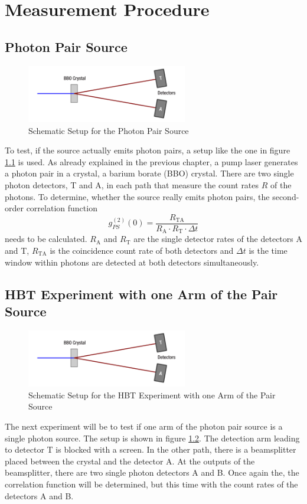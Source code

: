 \chapter{Measurement Procedure}
\section{Photon Pair Source}
\begin{figure}[H]
    \centering
    \includegraphics[width=70mm,scale=0.5]{Quantenoptik/include/A1.PNG}
    \caption{Schematic Setup for the Photon Pair Source} 
    \label{fig:A1}
\end{figure}
To test, if the source actually emits photon pairs, a setup like the one in figure \ref{fig:A1} is used. As already explained in the previous chapter, a pump laser generates a photon pair in a crystal, a barium borate (BBO) crystal. There are two single photon detectors, T and A, in each path that measure the count rates $R$ of the photons. To determine, whether the source really emits photon pairs, the second-order correlation function 
\begin{equation}
    g_{PS}^{(2)}(0)=\frac{R_\text{TA}}{R_\text{A}\cdot R_\text{T}\cdot \Delta t}
\end{equation}
needs to be calculated. $R_\text{A}$ and $R_\text{T}$ are the single detector rates of the detectors A and T, $R_\text{TA}$ is the coincidence count rate of both detectors and $\Delta t$ is the time window within photons are detected at both detectors simultaneously. 

\section{HBT Experiment with one Arm of the Pair Source}
\begin{figure}[H]
    \centering
    \includegraphics[width=70mm,scale=0.5]{Quantenoptik/include/A1.PNG}
    \caption{Schematic Setup for the HBT Experiment with one Arm of the Pair Source} 
    \label{fig:A2}
\end{figure}
The next experiment will be to test if one arm of the photon pair source is a single photon source. The setup is shown in figure \ref{fig:A2}. The detection arm leading to detector T is blocked with a screen. In the other path, there is a beamsplitter placed between the crystal and the detector A. At the outputs of the beamsplitter, there are two single photon detectors A and B. Once again the, the correlation function will be determined, but this time with the count rates of the detectors A and B. 

